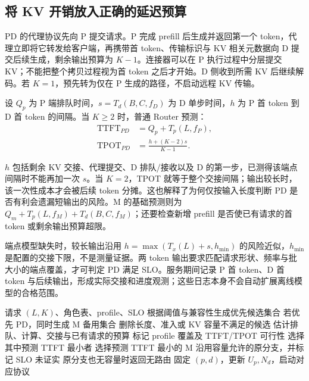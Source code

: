 \documentclass[11pt,a4paper,twocolumn]{article}
\newcommand{\TTFT}{\mathrm{TTFT}}
\newcommand{\TPOT}{\mathrm{TPOT}}
\begin{document}
\subsection{将 KV 开销放入正确的延迟预算}
PD 的代理协议先向 P 提交请求。P 完成 prefill 后生成并返回第一个 token，代理立即将它转发给客户端，再携带首 token、传输标识与 KV 相关元数据向 D 提交后续生成，剩余输出预算为 $K-1$。连接器可以在 P 执行过程中分层提交 KV；不能把整个拷贝过程视为首 token 之后才开始。D 侧收到所需 KV 后继续解码。若 $K=1$，预先转为仅在 P 生成的路径，不启动远程 KV 传输。

\begin{samepage}
设 $Q_p$ 为 P 端排队时间，$s=T_d(B,C,f_D)$ 为 D 单步时间，$h$ 为 P 首 token 到 D 首 token 的间隔。当 $K\ge2$ 时，普通 Router 预测：
\begin{align}
 \TTFT_{PD}&=Q_p+T_p(L,f_P),\\
 \TPOT_{PD}&=\frac{h+(K-2)s}{K-1}.
 \label{eq:handoff}
\end{align}
\end{samepage}
$h$ 包括剩余 KV 交接、代理提交、D 排队/接收以及 D 的第一步，已测得该端点间隔时不能再加一次 $s$。当 $K=2$，TPOT 就等于整个交接间隔；输出较长时，该一次性成本才会被后续 token 分摊。这也解释了为何仅按输入长度判断 PD 是否有利会遗漏短输出的风险。M 的基础预测则为 $Q_m+T_p(L,f_M)+T_d(B,C,f_M)$；还要检查新增 prefill 是否使已有请求的首 token 或剩余输出预算超限。

端点模型缺失时，较长输出沿用 $h=\max(T_x(L)+s,h_{\min})$ 的风险近似，$h_{\min}$ 是配置的交接下限，不是测量证据。两 token 输出要求匹配请求形状、频率与批大小的端点覆盖，才可判定 PD 满足 SLO。服务期间记录 P 首 token、D 首 token 与后续输出，形成实际交接和进度观测；这些日志本身不会自动扩展离线模型的合格范围。

\begin{algorithm}[t]
\caption{普通 Router 的请求分配}
\label{alg:route}
\small
\begin{algorithmic}[1]
\Require 请求 $(L,K)$、角色表、profile、SLO
\State 根据阈值与兼容性生成优先候选集合
\State 若优先 PD，同时生成 M 备用集合
\State 删除长度、准入或 KV 容量不满足的候选
  \State 估计排队、计算、交接与已有请求的预算
  \State 标记 profile 覆盖及 TTFT/TPOT 可行性
\EndFor
{}
  \State 选择其中预测 TTFT 最小者
  \State 选择预测 TTFT 最小的 M
\Else
  \State 沿用容量允许的原分支，并标记 SLO 未证实
  \State 原分支也无容量时返回无路由
\EndIf
\State 固定 $(p,d)$，更新 $U_p,N_d$，启动对应协议
\end{algorithmic}
\end{algorithm}
\end{document}
